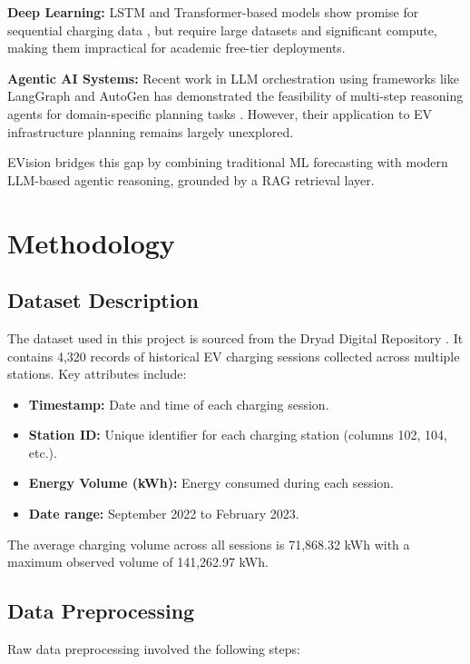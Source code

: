 \documentclass[conference]{IEEEtran}
\begin{document}
\textbf{Deep Learning:} LSTM and Transformer-based models show promise for sequential charging data \cite{hochreiter1997long}, but require large datasets and significant compute, making them impractical for academic free-tier deployments.

\textbf{Agentic AI Systems:} Recent work in LLM orchestration using frameworks like LangGraph and AutoGen has demonstrated the feasibility of multi-step reasoning agents for domain-specific planning tasks \cite{langchain2024}. However, their application to EV infrastructure planning remains largely unexplored.

EVision bridges this gap by combining traditional ML forecasting with modern LLM-based agentic reasoning, grounded by a RAG retrieval layer.

\section{Methodology}

\subsection{Dataset Description}

The dataset used in this project is sourced from the Dryad Digital Repository \cite{dryad2023}. It contains 4,320 records of historical EV charging sessions collected across multiple stations. Key attributes include:

\begin{itemize}
    \item \textbf{Timestamp:} Date and time of each charging session.
    \item \textbf{Station ID:} Unique identifier for each charging station (columns 102, 104, etc.).
    \item \textbf{Energy Volume (kWh):} Energy consumed during each session.
    \item \textbf{Date range:} September 2022 to February 2023.
\end{itemize}

The average charging volume across all sessions is 71,868.32 kWh with a maximum observed volume of 141,262.97 kWh.

\subsection{Data Preprocessing}

Raw data preprocessing involved the following steps:
\end{document}
